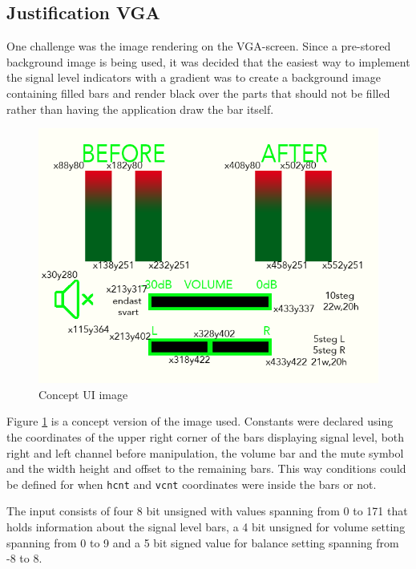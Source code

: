 \subsection{Justification VGA}

One challenge was the image rendering on the VGA-screen. Since a
pre-stored background image is being used, it was decided that the
easiest way to implement the signal level indicators with a gradient
was to create a background image containing filled bars and render
black over the parts that should not be filled rather than having the
application draw the bar itself.

\begin{figure}[H]
        \centering 
        \includegraphics[scale=1.00]{fig/picture_xy.png}
        \caption{Concept UI image}
        \label{fig:picture_xy}
\end{figure}

Figure \ref{fig:picture_xy} is a concept version of the image
used. Constants were declared using the coordinates of the upper right
corner of the bars displaying signal level, both right and left
channel before manipulation, the volume bar and the mute symbol and
the width height and offset to the remaining bars. This way conditions
could be defined for when \verb+hcnt+ and \verb+vcnt+ coordinates were
inside the bars or not.

The input consists of four 8 bit unsigned with values spanning from 0
to 171 that holds information about the signal level bars, a 4 bit
unsigned for volume setting spanning from 0 to 9 and a 5 bit signed
value for balance setting spanning from -8 to 8.

